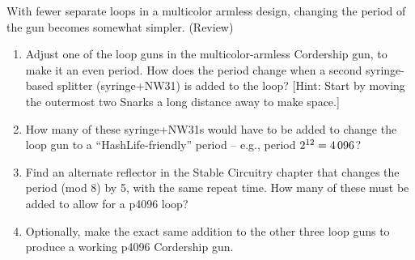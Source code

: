 \begin{multicols}{2}
	
	\mfilbreak
	
	
	
	\begin{problem}\label{exer:multicolor_armless}
		With fewer separate loops in a multicolor armless design, changing the period of the gun becomes somewhat simpler. (Review)
		\begin{enumerate}[label=\bf\color{ocre}(\alph*)]
			\item Adjust one of the loop guns in the multicolor-armless Cordership gun, to make it an even period. How does the period change when a second syringe-based splitter (syringe+NW31) is added to the loop? [Hint: Start by moving the outermost two Snarks a long distance away to make space.]
			\item How many of these syringe+NW31s would have to be added to change the loop gun to a ``HashLife-friendly'' period -- e.g., period $2^{12} = 4{\,}096$?
			\item Find an alternate reflector in the Stable Circuitry chapter %
			that changes the period (mod 8) by 5, with the same repeat time. How many of these must be added to allow for a p4096 loop?
			\item Optionally, make the exact same addition to the other three loop guns to produce a working p4096 Cordership gun.
		\end{enumerate}
	\end{problem}
	

\end{multicols}
